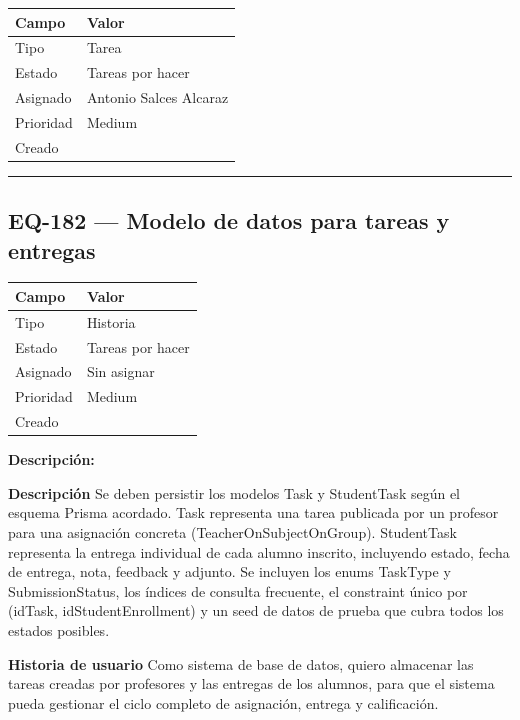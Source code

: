 \documentclass[
  spanish,
  11pt,
]{report}
\newcounter{none} %
\begin{document}
{\def\LTcaptype{none} %
\begin{longtable}[]{@{}ll@{}}
\toprule\noalign{}
Campo & Valor \\
\midrule\noalign{}
\endhead
\bottomrule\noalign{}
\endlastfoot
Tipo & Tarea \\
Estado & Tareas por hacer \\
Asignado & Antonio Salces Alcaraz \\
Prioridad & Medium \\
Creado & \\
\end{longtable}
}

\begin{center}\rule{0.5\linewidth}{0.5pt}\end{center}

\subsection{EQ-182 --- Modelo de datos para tareas y
entregas}\label{eq-182-modelo-de-datos-para-tareas-y-entregas}

{\def\LTcaptype{none} %
\begin{longtable}[]{@{}ll@{}}
\toprule\noalign{}
Campo & Valor \\
\midrule\noalign{}
\endhead
\bottomrule\noalign{}
\endlastfoot
Tipo & Historia \\
Estado & Tareas por hacer \\
Asignado & Sin asignar \\
Prioridad & Medium \\
Creado & \\
\end{longtable}
}

\textbf{Descripción:}

\textbf{Descripción} Se deben persistir los modelos Task y StudentTask
según el esquema Prisma acordado. Task representa una tarea publicada
por un profesor para una asignación concreta (TeacherOnSubjectOnGroup).
StudentTask representa la entrega individual de cada alumno inscrito,
incluyendo estado, fecha de entrega, nota, feedback y adjunto. Se
incluyen los enums TaskType y SubmissionStatus, los índices de consulta
frecuente, el constraint único por (idTask, idStudentEnrollment) y un
seed de datos de prueba que cubra todos los estados posibles.

\textbf{Historia de usuario} Como sistema de base de datos, quiero
almacenar las tareas creadas por profesores y las entregas de los
alumnos, para que el sistema pueda gestionar el ciclo completo de
asignación, entrega y calificación.
\end{document}
